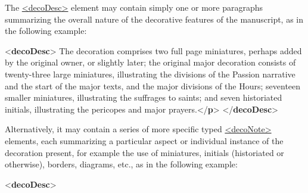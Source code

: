 The \hyperref[TEI.decoDesc]{<decoDesc>} element may contain simply one or more paragraphs summarizing the overall nature of the decorative features of the manuscript, as in the following example: \par\bgroup{}\exampleFont \begin{shaded}\noindent\mbox{}{<\textbf{decoDesc}>}\mbox{}\newline 
{}The decoration comprises two full page miniatures, perhaps added by the\mbox{}\newline 
\hspace*{1em}\hspace*{1em} original owner, or slightly later; the original major decoration consists of\mbox{}\newline 
\hspace*{1em}\hspace*{1em} twenty-three large miniatures, illustrating the divisions of the Passion\mbox{}\newline 
\hspace*{1em}\hspace*{1em} narrative and the start of the major texts, and the major divisions of the\mbox{}\newline 
\hspace*{1em}\hspace*{1em} Hours; seventeen smaller miniatures, illustrating the suffrages to saints; and\mbox{}\newline 
\hspace*{1em}\hspace*{1em} seven historiated initials, illustrating the pericopes and major prayers.{</\textbf{p}>}\mbox{}\newline 
{</\textbf{decoDesc}>}\end{shaded}\egroup\par \noindent  Alternatively, it may contain a series of more specific typed \hyperref[TEI.decoNote]{<decoNote>} elements, each summarizing a particular aspect or individual instance of the decoration present, for example the use of miniatures, initials (historiated or otherwise), borders, diagrams, etc., as in the following example: \par\bgroup{}\exampleFont \begin{shaded}\noindent\mbox{}{<\textbf{decoDesc}>}\mbox{}\newline 

\end{shaded}
